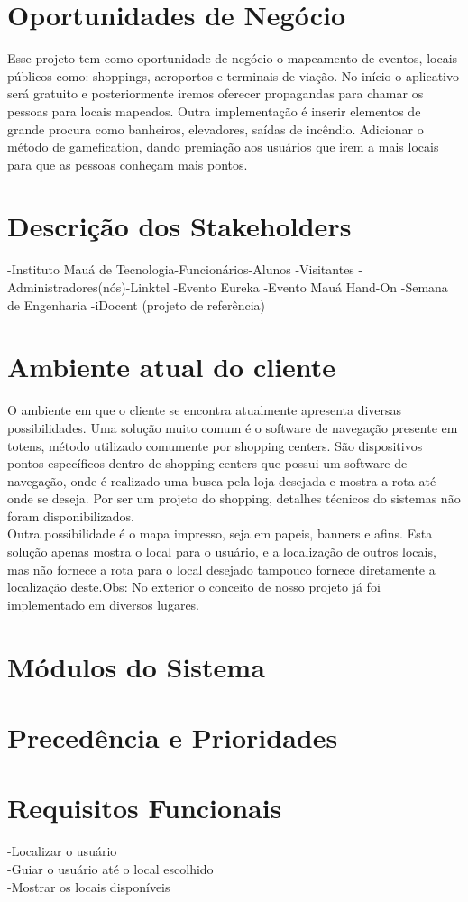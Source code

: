 \documentclass[12pt]{article}
\begin{document}
\section*{Oportunidades de Negócio}
	Esse projeto tem como oportunidade de negócio o mapeamento de eventos, locais públicos como: shoppings, aeroportos e terminais de viação.
	No início o aplicativo será gratuito e posteriormente iremos oferecer propagandas para chamar os pessoas para locais mapeados. Outra implementação é inserir elementos de grande procura como banheiros, elevadores, saídas de incêndio. Adicionar o método de gamefication, dando premiação aos usuários que irem a mais locais para que as pessoas conheçam mais pontos.
\section*{Descrição dos Stakeholders}
-Instituto Mauá de Tecnologia-Funcionários-Alunos -Visitantes -Administradores(nós)-Linktel -Evento Eureka 
-Evento Mauá Hand-On -Semana de Engenharia -iDocent (projeto de referência) 
\section*{Ambiente atual do cliente} 
O ambiente em que o cliente se encontra atualmente apresenta diversas possibilidades. Uma solução muito comum é o software de navegação presente em totens, método utilizado comumente por shopping centers. São dispositivos pontos específicos dentro de shopping centers que possui um software de navegação, onde é realizado uma busca pela loja desejada e mostra a rota até onde se deseja. Por ser um projeto do shopping, detalhes técnicos do sistemas não foram disponibilizados.\\
Outra possibilidade é o mapa impresso, seja em papeis, banners e afins. Esta solução apenas mostra o local para o usuário, e a localização de outros locais, mas não fornece a rota para o local desejado tampouco fornece diretamente a localização deste.Obs: No exterior o conceito de nosso projeto já foi implementado em diversos lugares.
\section*{Módulos do Sistema}
\section*{Precedência e Prioridades}
\section*{Requisitos Funcionais}
-Localizar o usuário\\
-Guiar o usuário até o local escolhido\\
-Mostrar os locais disponíveis\\
\end{document}
